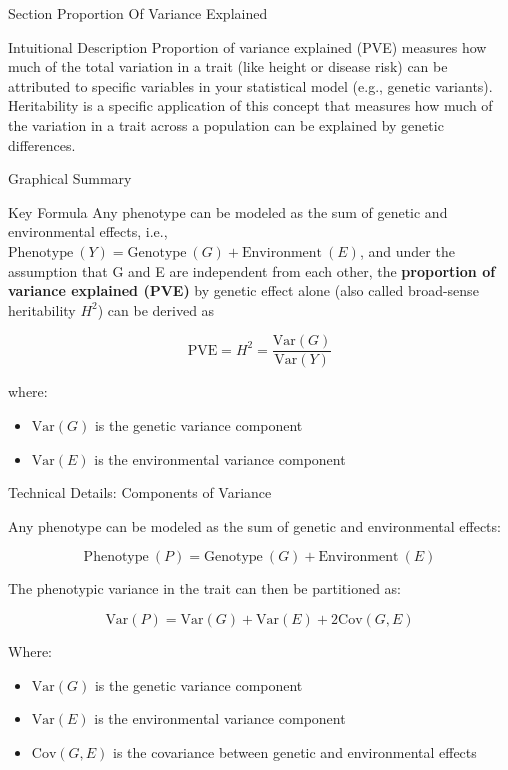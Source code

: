 
\begin{frame}{Section}
\centering
\Huge{Proportion Of Variance Explained}
\end{frame}


\begin{frame}{Intuitional Description}
Proportion of variance explained (PVE) measures how much of the total variation in a trait (like height or disease risk) can be attributed to specific variables in your statistical model (e.g., genetic variants). Heritability is a specific application of this concept that measures how much of the variation in a trait across a population can be explained by genetic differences.
\end{frame}

\begin{frame}{Graphical Summary}

\end{frame}


\begin{frame}{Key Formula}
Any phenotype can be modeled as the sum of genetic and environmental effects, i.e., $\text{Phenotype}~(Y) = \text{Genotype}~(G) + \text{Environment}~(E)$, and under the assumption that G and E are independent from each other, the \textbf{proportion of variance explained (PVE)} by genetic effect alone (also called  broad-sense heritability $H^2$) can be derived as 

$$
\text{PVE} = H^2 = \frac{\text{Var}(G)}{\text{Var}(Y)}
$$

where:
\begin{itemize}
\item $\text{Var}(G)$ is the genetic variance component
\item $\text{Var}(E)$ is the environmental variance component
\end{itemize}
\end{frame}


\begin{frame}{Technical Details: Components of Variance}

Any phenotype can be modeled as the sum of genetic and environmental effects:

$$\text{Phenotype}~(P) = \text{Genotype}~(G) + \text{Environment}~(E)$$

The phenotypic variance in the trait can then be partitioned as:

$$\text{Var}(P) = \text{Var}(G) + \text{Var}(E) + 2\text{Cov}(G,E)$$

Where:
\begin{itemize}
\item $\text{Var}(G)$ is the genetic variance component
\item $\text{Var}(E)$ is the environmental variance component
\item $\text{Cov}(G,E)$ is the covariance between genetic and environmental effects
\end{itemize}

\end{frame}

